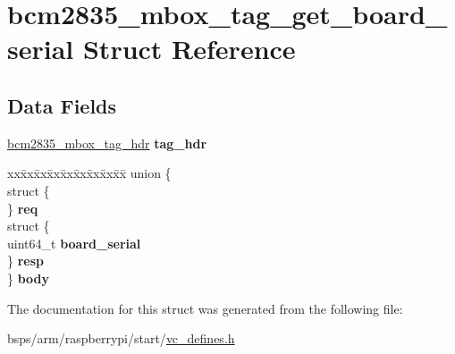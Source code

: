\hypertarget{structbcm2835__mbox__tag__get__board__serial}{}\section{bcm2835\+\_\+mbox\+\_\+tag\+\_\+get\+\_\+board\+\_\+serial Struct Reference}
\label{structbcm2835__mbox__tag__get__board__serial}
\subsection*{Data Fields}
\begin{DoxyCompactItemize}
\item 
\mbox{\label{structbcm2835__mbox__tag__get__board__serial_a316f794d962103f12c414cb60d6baf2a}} 
\mbox{\hyperlink{structbcm2835__mbox__tag__hdr}{bcm2835\+\_\+mbox\+\_\+tag\+\_\+hdr}} {\bfseries tag\+\_\+hdr}
\item 
\mbox{\label{structbcm2835__mbox__tag__get__board__serial_a97f8c0cb77984422ee21662b0beefe4f}} 
\begin{tabbing}
xx\=xx\=xx\=xx\=xx\=xx\=xx\=xx\=xx\=\kill
union \{\\
\>struct \{\\
\>\} {\bfseries req}\\
\>struct \{\\
\>\>uint64\_t {\bfseries board\_serial}\\
\>\} {\bfseries resp}\\
\} {\bfseries body}\\

\end{tabbing}\end{DoxyCompactItemize}


The documentation for this struct was generated from the following file\+:\begin{DoxyCompactItemize}
\item 
bsps/arm/raspberrypi/start/\mbox{\hyperlink{vc__defines_8h}{vc\+\_\+defines.\+h}}\end{DoxyCompactItemize}
